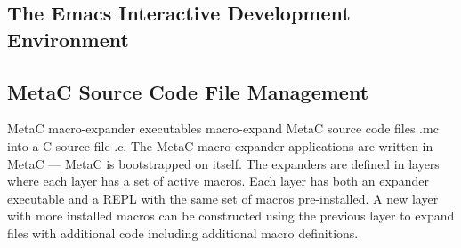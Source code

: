 \documentclass{article}
\begin{document}
\subsection{The Emacs Interactive Development Environment}

\subsection{MetaC Source Code File Management}

MetaC macro-expander executables macro-expand MetaC source code files .mc into a C source file .c.  The MetaC macro-expander applications
are written in MetaC --- MetaC is bootstrapped on itself.  The expanders are defined in layers where each layer has a set of active macros.
Each layer has both an expander executable and a REPL with the same set of macros pre-installed.  A new layer with more installed macros
can be constructed using the previous layer to expand files with additional code including additional macro definitions.
\end{document}
